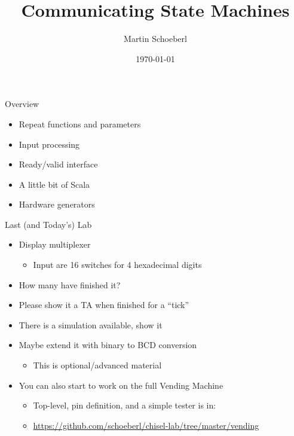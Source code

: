

\newif\ifbook


\title{Communicating State Machines}
\author{Martin Schoeberl}
\date{\today}



\begin{frame}
\titlepage
\end{frame}

\begin{frame}[fragile]{Overview}
\begin{itemize}
\item Repeat functions and parameters
\item Input processing
\item Ready/valid interface
\item A little bit of Scala
\item Hardware generators
\end{itemize}
\end{frame}

\begin{frame}[fragile]{Last (and Today's) Lab}
\begin{itemize}
\item Display multiplexer
\begin{itemize}
\item Input are 16 switches for 4 hexadecimal digits
\end{itemize}
\item How many have finished it?
\item Please show it a TA when finished for a ``tick''
\item There is a simulation available, show it
\item Maybe extend it with binary to BCD conversion
\begin{itemize}
\item This is optional/advanced material
\end{itemize}
\item You can also start to work on the full Vending Machine
\begin{itemize}
\item Top-level, pin definition, and a simple tester is in:
\item \url{https://github.com/schoeberl/chisel-lab/tree/master/vending}
\end{itemize}
\end{itemize}
\end{frame}


